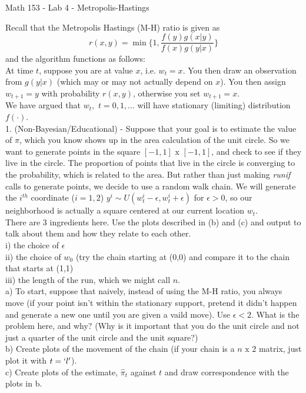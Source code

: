\documentclass{article}
\begin{document}
\centerline{Math 153 - Lab 4 - Metropolis-Hastings}
\vspace{.1in}\noindent
Recall that the Metropolis Hastings (M-H) ratio is given as 
$$r(x,y)=\min\{ 1, \frac{f(y)g(x|y)}{f(x)g(y|x)}\}$$
and the algorithm functions as follows:\\ 
At time $t$, suppose you are at value $x$, i.e. $w_t=x$.  You then draw an observation from $g(y|x)$ (which may or may not actually depend on $x$).  You then assign $w_{t+1}=y$ with probability $r(x,y)$, otherwise you set $w_{t+1}=x$.\\
We have argued that $w_t,$ $t=0,1,\dots$ will have stationary (limiting) distribution $f(\cdot)$.\\[10pt]
1.  (Non-Bayesian/Educational) - Suppose that your goal is to estimate the value of $\pi$, which you know shows up in the area calculation of the unit circle.  So we want to generate points in the square $[-1,1]\mbox{ x  }[-1,1]$, and check to see if they live in the circle.  The proportion of points that live in the circle is converging to the probability, which is related to the area.  But rather than just making {\it runif} calls to generate points, we decide to use a random walk chain.  We will generate the $i^{th}$ coordinate ($i=1,2$) $y^i\sim U(w_t^i-\epsilon, w_t^i+\epsilon)$ for $\epsilon > 0$, so our neighborhood is actually a square centered at our current location $w_t$.\\
There are 3 ingredients here. Use the plots described in (b) and (c) and output to talk about them and how they relate to each other.\\
i) the choice of $\epsilon$\\
ii) the choice of $w_0$ (try the chain starting at (0,0) and compare it to the chain that starts at (1,1)\\
iii) the length of the run, which we might call $n$.\\
a) To start, suppose that naively, instead of using the M-H ratio, you always move (if your point isn't within the stationary support, pretend it didn't happen and generate a new one until you are given a vaild move).  Use $\epsilon < 2$.  What is the problem here, and why? (Why is it important that you do the unit circle and not just a quarter of the unit circle and the unit square?) \\
b) Create plots of the movement of the chain (if your chain is a $n\mbox{ x } 2$ matrix, just plot it with $t=`l'$).\\        
c) Create plots of the estimate, $\hat{\pi}_t$ against $t$ and draw correspondence with the plots in b.\\
\end{document}
